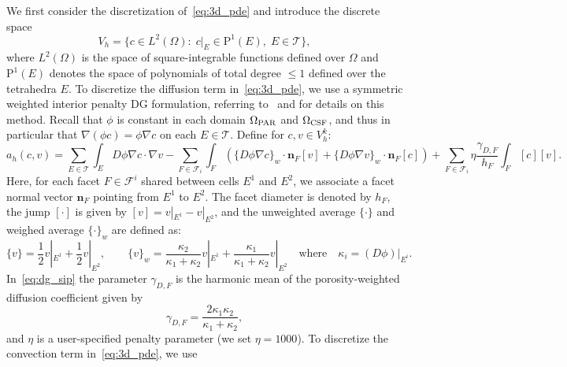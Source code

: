 \documentclass[fleqn,10pt]{wlscirep}
\begin{document}
We first consider the discretization of~\eqref{eq:3d_pde} and
introduce the discrete space
\begin{equation}
  V_h = \{c \in L^2(\Omega): \;  c \vert_E \in \mathrm{P}^1(E), \; E \in \mathcal{T}\} ,
\end{equation}
where $L^2(\Omega)$ is the space of square-integrable functions
defined over $\Omega$ and $\mathrm{P}^1(E)$ denotes the space of
polynomials of total degree $\leqslant 1$ defined over the tetrahedra
$E$. To discretize the diffusion term in~\eqref{eq:3d_pde}, we use a
symmetric weighted interior penalty DG formulation, referring
to~\cite{ern2009discontinuous} and \cite[Section
  4.5.2.3]{di2011mathematical} for details on this
method. Recall that $\phi$ is constant in each domain
  $\Omega_{\rm PAR}$ and $\Omega_{\rm CSF}$, and thus in particular
  that $\nabla (\phi c) = \phi \nabla c$ on each $E \in \mathcal{T}$.
Define for $c, v \in V_h^k$:
\begin{equation}
  a_h (c, v)
  =
  \sum_{E \in \mathcal{T}} \int_{E} D\phi \nabla c \cdot \nabla v
  - \sum_{F \in \mathcal{F}_i} \int_{F} \left( \{D \phi \nabla c \}_w \cdot \bm n_F [v]
  + \{D \phi \nabla v \}_w \cdot \bm n_F [c] \right) 
   + \sum_{F \in \mathcal{F}_i} \eta \frac{\gamma_{D,F}}{h_F} \int_{F} [c][v] 
  .
  \label{eq:dg_sip}
\end{equation}
Here, for each facet $F \in \mathcal{F}^i$ shared
between cells $E^1$ and $E^2$, we associate a  facet normal vector $\bm n_F$
pointing from $E^1$ to $E^2$. The facet diameter is denoted by $h_F$,
the jump $[\cdot]$ is given by $[v] = v|_{E^1} - v|_{E^2}$, and the
unweighted average $\{ \cdot \}$ and weighed average $\{ \cdot \}_w$
are defined as:
\begin{equation}
  \{v\} = \frac12 v |_{E^1} + \frac12 v |_{E^2}, \qquad
  \{v\}_{w} = \frac{\kappa_2}{\kappa_1 + \kappa_2} v |_{E^1} + \frac{\kappa_1}{\kappa_1 + \kappa_2} v |_{E^2}
  \quad \text{where} \quad \kappa_i = (D \phi) |_{E^i}.  
\end{equation}
In~\eqref{eq:dg_sip} the parameter $\gamma_{D,F}$ is the harmonic mean of the
porosity-weighted diffusion coefficient given by
\begin{equation}
  \gamma_{D,F} = \frac{2\kappa_1\kappa_2}{\kappa_1 + \kappa_2},
\end{equation}
and $\eta$ is a user-specified penalty parameter (we set $\eta=1000$). To discretize the convection term in~\eqref{eq:3d_pde}, we use
\end{document}
